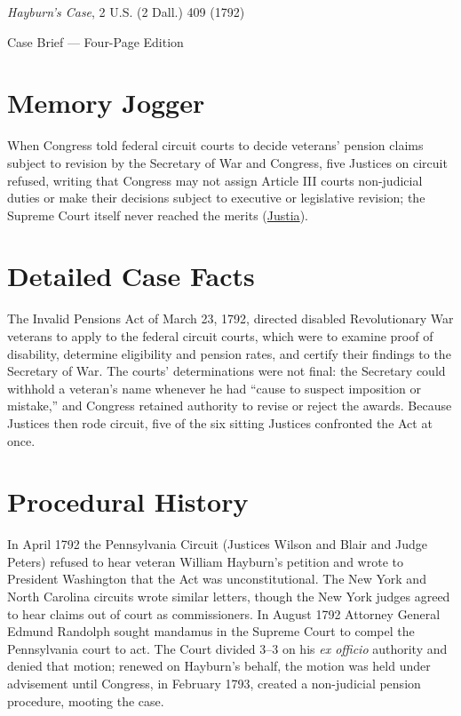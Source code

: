 \documentclass[12pt]{article}
\begin{document}
\begin{center}
{\LARGE \textit{Hayburn's Case}, 2 U.S. (2 Dall.) 409 (1792)\par}
\vspace{0.8em}
{\large Case Brief --- Four-Page Edition\par}
\end{center}
\vspace{1em}

\section{Memory Jogger}

When Congress told federal circuit courts to decide veterans' pension claims subject to revision by the Secretary of War and Congress, five Justices on circuit refused, writing that Congress may not assign Article III courts non-judicial duties or make their decisions subject to executive or legislative revision; the Supreme Court itself never reached the merits (\href{https://supreme.justia.com/cases/federal/us/2/409/}{Justia}).

\section{Detailed Case Facts}

The Invalid Pensions Act of March 23, 1792, directed disabled Revolutionary War veterans to apply to the federal circuit courts, which were to examine proof of disability, determine eligibility and pension rates, and certify their findings to the Secretary of War. The courts' determinations were not final: the Secretary could withhold a veteran's name whenever he had ``cause to suspect imposition or mistake,'' and Congress retained authority to revise or reject the awards. Because Justices then rode circuit, five of the six sitting Justices confronted the Act at once.

\section{Procedural History}

In April 1792 the Pennsylvania Circuit (Justices Wilson and Blair and Judge Peters) refused to hear veteran William Hayburn's petition and wrote to President Washington that the Act was unconstitutional. The New York and North Carolina circuits wrote similar letters, though the New York judges agreed to hear claims out of court as commissioners. In August 1792 Attorney General Edmund Randolph sought mandamus in the Supreme Court to compel the Pennsylvania court to act. The Court divided 3--3 on his \textit{ex officio} authority and denied that motion; renewed on Hayburn's behalf, the motion was held under advisement until Congress, in February 1793, created a non-judicial pension procedure, mooting the case.
\end{document}
